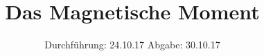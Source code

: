 

\subject{V105}
\title{Das Magnetische Moment}
\date{%
  Durchführung: 24.10.17
  \hspace{3em}
  Abgabe: 30.10.17
}



\maketitle
\thispagestyle{empty}
\tableofcontents
\newpage






\printbibliography{}


